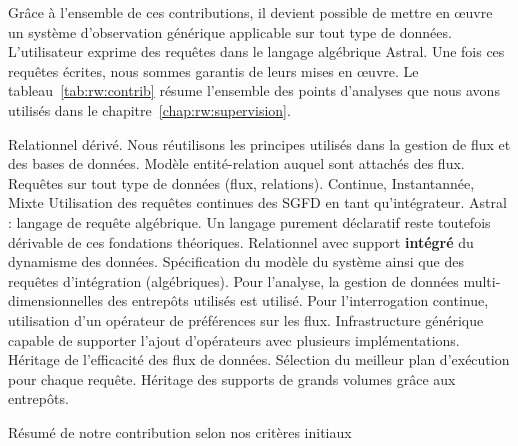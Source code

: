 Grâce à l'ensemble de ces contributions, il devient possible de mettre en œuvre un système d'observation générique applicable sur tout type de données. L'utilisateur exprime des requêtes dans le langage algébrique Astral. Une fois ces requêtes écrites, nous sommes garantis de leurs mises en œuvre. Le tableau~\ref{tab:rw:contrib} résume l'ensemble des points d'analyses que nous avons utilisés dans le chapitre~\ref{chap:rw:supervision}.
\begin{table}[!ht]
\criteretabDonnee
    {Relationnel dérivé. Nous réutilisons les principes utilisés dans la gestion de flux et des bases de données.}
    {\meh Modèle entité-relation auquel sont attachés des flux.}
    {\good Requêtes sur tout type de données (flux, relations).}
\criteretabTraitement
    {\good Continue, Instantannée, Mixte}
    {\good Utilisation des requêtes continues des SGFD en tant qu'intégrateur.}
    {\meh Astral : langage de requête algébrique. Un langage purement déclaratif reste toutefois dérivable de ces fondations théoriques.}
    {\good Relationnel avec support \textbf{intégré} du dynamisme des données.}
\criteretabAdaptabilite
    {\good Spécification du modèle du système ainsi que des requêtes d'intégration (algébriques).}
    {\meh Pour l'analyse, la gestion de données multi-dimensionnelles des entrepôts utilisés est utilisé. Pour l'interrogation continue, utilisation d'un opérateur de préférences sur les flux.}
    {\good Infrastructure générique capable de supporter l'ajout d'opérateurs avec plusieurs implémentations.}
    {\good Héritage de l'efficacité des flux de données. Sélection du meilleur plan d'exécution pour chaque requête. Héritage des supports de grands volumes grâce aux entrepôts.}
\caption{Résumé de notre contribution selon nos critères initiaux}\label{tab:rw:contrib}
\end{table}